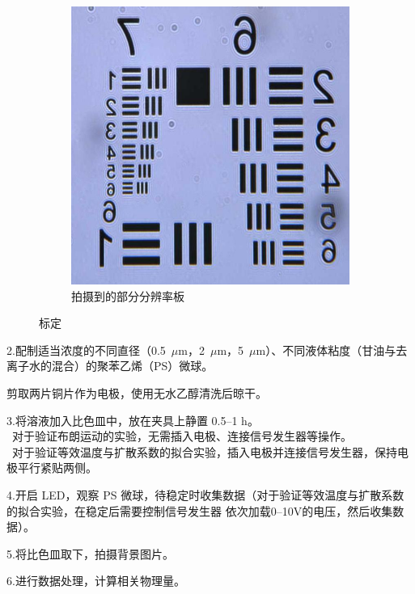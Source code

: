 \documentclass[a4paper]{report} %
\begin{document}
\begin{figure}[H]
\begin{subfigure}{0.45\textwidth}
        \includegraphics[width=\linewidth]{标定.jpg}
        \caption{拍摄到的部分分辨率板}
    \end{subfigure}

    \caption{标定}
    \label{fig:biaoding}
\end{figure}
2.配制适当浓度的不同直径（0.5~$\mu$m，2~$\mu$m，5~$\mu$m）、不同液体粘度（甘油与去离子水的混合）的聚苯乙烯（PS）微球。\par
剪取两片铜片作为电极，使用无水乙醇清洗后晾干。\par
3.将溶液加入比色皿中，放在夹具上静置 0.5--1 h。\\ 
\quad \textbullet\ 对于验证布朗运动的实验，无需插入电极、连接信号发生器等操作。 \\
\quad \textbullet\ 对于验证等效温度与扩散系数的拟合实验，插入电极并连接信号发生器，保持电极平行紧贴两侧。\par
4.开启 LED，观察 PS 微球，待稳定时收集数据（对于验证等效温度与扩散系数的拟合实验，在稳定后需要控制信号发生器
依次加载0--10V的电压，然后收集数据）。\par
5.将比色皿取下，拍摄背景图片。\par
6.进行数据处理，计算相关物理量。\par
\end{document}
